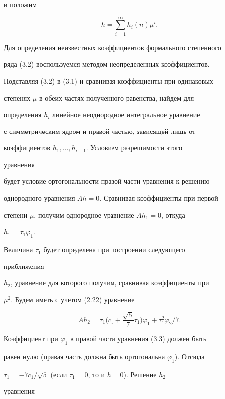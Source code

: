 и положим 


\begin{equation} 


h=\sum^\infty_{i=1}h_i(n)\mu^i.\tag{3.2} 


\end{equation} 


Для определения неизвестных коэффициентов формального степенного 


ряда (3.2) воспользуемся методом неопределенных коэффициентов. 


Подставляя (3.2) в (3.1) и сравнивая коэффициенты при одинаковых 


степенях $\mu$ в обеих частях полученного равенства, найдем для 


определения $h_i$ линейное неоднородное интегральное уравнение 


с симметрическим ядром и правой частью, зависящей лишь от 


коэффициентов $h_1,\dotsc, h_{i-1}$. Условием разрешимости этого 


уравнения 


будет условие ортогональности правой части уравнения к решению 


однородного уравнения $A h=0$. Сравнивая коэффициенты при первой 


степени $\mu$, получим однородное уравнение $A h_1=0$, откуда 


$h_1=\tau_1\varphi_1$. 


Величина $\tau_1$ будет определена при построении следующего 


приближения 


$h_2$, уравнение для которого получим, сравнивая коэффициенты при 


$\mu^2$. Будем иметь с учетом (2.22) уравнение 


\begin{equation} 


A h_2=\tau_1\bigg(c_1+\frac{\sqrt{5}}{7}\tau_1\bigg)\varphi_1+ 


\tau^2_1\varphi_2/7.\tag{3.3} 


\end{equation} 


Коэффициент при $\varphi_1$ в правой части уравнения (3.3) должен быть  


равен нулю (правая часть должна быть ортогональна $\varphi_1$). Отсюда 


$\tau_1=-7c_1/\sqrt{5}$ (если $\tau_1=0$, то и $h=0$). Решение $h_2$ 


уравнения 


